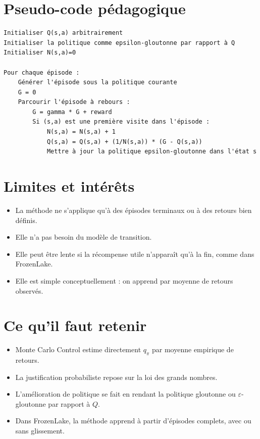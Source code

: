 \documentclass[11pt,a4paper]{article}
\begin{document}
\section{Pseudo-code pédagogique}

\begin{verbatim}
Initialiser Q(s,a) arbitrairement
Initialiser la politique comme epsilon-gloutonne par rapport à Q
Initialiser N(s,a)=0

Pour chaque épisode :
    Générer l'épisode sous la politique courante
    G = 0
    Parcourir l'épisode à rebours :
        G = gamma * G + reward
        Si (s,a) est une première visite dans l'épisode :
            N(s,a) = N(s,a) + 1
            Q(s,a) = Q(s,a) + (1/N(s,a)) * (G - Q(s,a))
            Mettre à jour la politique epsilon-gloutonne dans l'état s
\end{verbatim}

\section{Limites et intérêts}

\begin{itemize}[leftmargin=1.6em]
    \item La méthode ne s'applique qu'à des épisodes terminaux ou à des retours bien définis.
    \item Elle n'a pas besoin du modèle de transition.
    \item Elle peut être lente si la récompense utile n'apparaît qu'à la fin, comme dans FrozenLake.
    \item Elle est simple conceptuellement : on apprend par moyenne de retours observés.
\end{itemize}

\section{Ce qu'il faut retenir}

\begin{itemize}[leftmargin=1.6em]
    \item Monte Carlo Control estime directement $q_{\pi}$ par moyenne empirique de retours.
    \item La justification probabiliste repose sur la loi des grands nombres.
    \item L'amélioration de politique se fait en rendant la politique gloutonne ou $\varepsilon$-gloutonne par rapport à $Q$.
    \item Dans FrozenLake, la méthode apprend à partir d'épisodes complets, avec ou sans glissement.
\end{itemize}
\end{document}

